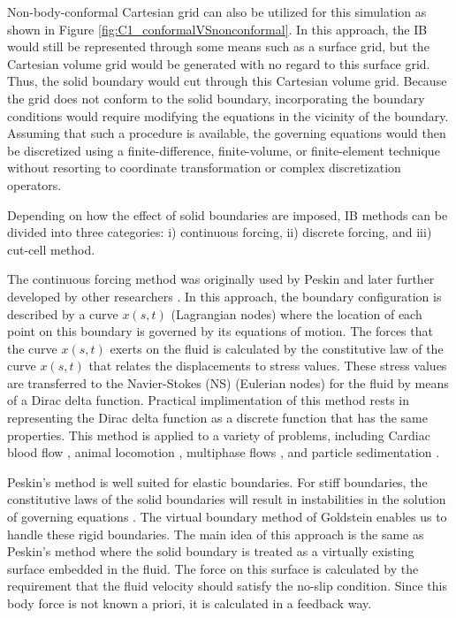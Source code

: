 %
Non-body-conformal Cartesian grid can also be utilized for this simulation as shown in Figure \ref{fig:C1_conformalVSnonconformal}. In this approach, the IB would still be represented through some means such as a surface grid, but the Cartesian volume grid would be generated with no regard to this surface grid. Thus, the solid boundary would cut through this Cartesian volume grid. Because the grid does not conform to the solid boundary, incorporating the boundary conditions would require modifying the equations in the vicinity of the boundary. Assuming that such a procedure is available, the governing equations would then be discretized using a finite-difference, finite-volume, or finite-element technique without resorting to coordinate transformation or complex discretization operators.

Depending on how the effect of solid boundaries are imposed, IB methods can be divided into three categories: i) continuous forcing, ii) discrete forcing, and iii) cut-cell method.

The continuous forcing method was originally used by Peskin \cite{peskin1977numerical} and later further developed by other researchers \cite{saiki1996numerical, zhu2003interaction, beyer1992analysis}. In this approach, the boundary configuration is described by a curve $x(s,t)$ (Lagrangian nodes) where the location of each point on this boundary is governed by its equations of motion. The forces that the curve $x(s,t)$ exerts on the fluid is calculated by the constitutive law of the curve $x(s,t)$ that relates the displacements to stress values. These stress values are transferred to the Navier-Stokes (NS) (Eulerian nodes) for the fluid by means of a Dirac delta function. Practical implimentation of this method rests in representing the Dirac delta function as a discrete function that has the same properties. This method is applied to a variety of problems, including Cardiac blood flow \cite{peskin1989three}, animal locomotion \cite{fauci1988computational}, multiphase flows \cite{kempe2015imposing}, and particle sedimentation \cite{uhlmann2005immersed}.

Peskin's method is well suited for elastic boundaries. For stiff boundaries, the constitutive laws of the solid boundaries will result in instabilities in the solution of governing equations \cite{mittal2005immersed}. The virtual boundary method of Goldstein \cite{goldstein1993modeling} enables us to handle these rigid boundaries. The main idea of this approach is the same as Peskin's method where the solid boundary is treated as a virtually existing surface embedded in the fluid. The force on this surface is calculated by the requirement that the fluid velocity should satisfy the no-slip condition. Since this body force is not known a priori, it is calculated in a feedback way.

